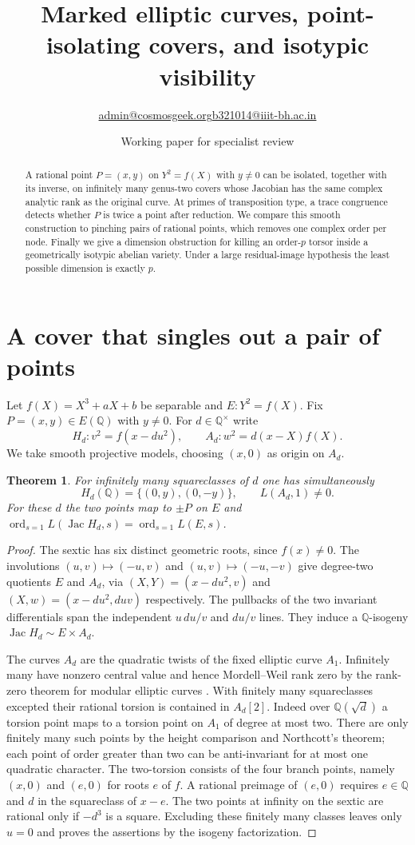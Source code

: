 \documentclass[11pt]{article}
\title{Marked elliptic curves, point-isolating covers, and isotypic visibility}
\author{\small \href{mailto:admin@cosmosgeek.org}{admin@cosmosgeek.org}\qquad \href{mailto:b321014@iiit-bh.ac.in}{b321014@iiit-bh.ac.in}}
\date{Working paper for specialist review}
\newtheorem{theorem}{Theorem}\newtheorem{proposition}[theorem]{Proposition}
\newcommand{\Q}{\mathbb Q}\newcommand{\F}{\mathbb F}\newcommand{\Sha}{\mathrm{Sha}}
\begin{document}
\maketitle
\begin{abstract}
A rational point $P=(x,y)$ on $Y^2=f(X)$ with $y\ne0$ can be isolated,
together with its inverse, on infinitely many genus-two covers whose
Jacobian has the same complex analytic rank as the original curve.
At primes of transposition type, a trace congruence detects whether $P$
is twice a point after reduction. We compare this smooth construction to
pinching pairs of rational points, which removes one complex order per
node. Finally we give a dimension obstruction for killing an order-$p$
torsor inside a geometrically isotypic abelian variety. Under a large
residual-image hypothesis the least possible dimension is exactly $p$.
\end{abstract}
\section{A cover that singles out a pair of points}
Let $f(X)=X^3+aX+b$ be separable and $E:Y^2=f(X)$. Fix
$P=(x,y)\in E(\Q)$ with $y\ne0$. For $d\in\Q^\times$ write
\[
 H_d: v^2=f(x-du^2),\qquad A_d:w^2=d(x-X)f(X).
\]
We take smooth projective models, choosing $(x,0)$ as origin on $A_d$.
\begin{theorem}\label{th:cover}
For infinitely many squareclasses of $d$ one has simultaneously
\[
 H_d(\Q)=\{(0,y),(0,-y)\},\qquad L(A_d,1)\ne0.
\]
For these $d$ the two points map to $\pm P$ on $E$ and
$\operatorname{ord}_{s=1}L(\operatorname{Jac}H_d,s)
=\operatorname{ord}_{s=1}L(E,s)$.
\end{theorem}
\begin{proof}
The sextic has six distinct geometric roots, since $f(x)\ne0$.
The involutions $(u,v)\mapsto(-u,v)$ and $(u,v)\mapsto(-u,-v)$
give degree-two quotients $E$ and $A_d$, via
$(X,Y)=(x-du^2,v)$ and $(X,w)=(x-du^2,duv)$ respectively. The
pullbacks of the two invariant differentials span the independent
$u\,du/v$ and $du/v$ lines. They induce a $\Q$-isogeny
$\operatorname{Jac}H_d\sim E\times A_d$.

The curves $A_d$ are the quadratic twists of the fixed elliptic
curve $A_1$. Infinitely many have nonzero central value
\cite{OS} and hence Mordell--Weil rank zero by the rank-zero
theorem for modular elliptic curves \cite{Wiles}. With finitely
many squareclasses excepted their rational torsion is contained
in $A_d[2]$. Indeed over $\Q(\sqrt d)$ a torsion point maps to a
torsion point on $A_1$ of degree at most two. There are only finitely
many such points by the height comparison and Northcott's theorem;
each point of order greater than two can be anti-invariant for at most
one quadratic character. The two-torsion consists of the four branch
points, namely $(x,0)$ and $(e,0)$ for roots $e$ of $f$. A rational
preimage of $(e,0)$ requires $e\in\Q$ and $d$ in the squareclass of
$x-e$. The two points at infinity on the sextic are rational only
if $-d^3$ is a square. Excluding these finitely many classes leaves
only $u=0$ and proves the assertions by the isogeny factorization.
\end{proof}
\end{document}
